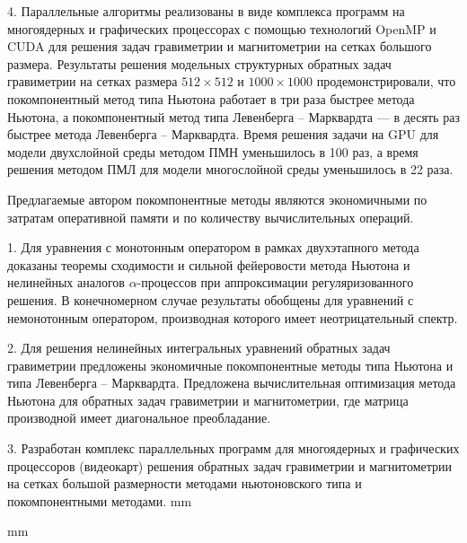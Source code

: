\documentclass[%
autoref,     %
href,        %
colorlinks,  %
]{disser}
\begin{document}
4. Параллельные алгоритмы реализованы в виде комплекса программ на многоядерных и графических процессорах с помощью технологий OpenMP и CUDA для решения задач гравиметрии и магнитометрии на сетках большого размера. 
Результаты решения модельных структурных обратных задач гравиметрии на сетках размера $512\times 512$ и $1000\times 1000$ продемонстрировали, что покомпонентный метод типа Ньютона работает в три раза быстрее метода Ньютона, а покомпонентный метод типа Левенберга -- Марквардта --- в десять раз быстрее метода Левенберга -- Марквардта. Время решения задачи на GPU для модели двухслойной среды методом ПМН уменьшилось в 100 раз, а время решения методом ПМЛ для модели многослойной среды уменьшилось в 22 раза. 

Предлагаемые автором покомпонентные методы являются экономичными по затратам оперативной памяти и по количеству вычислительных операций.

1. Для уравнения с монотонным оператором в рамках двухэтапного метода доказаны теоремы сходимости и сильной фейеровости метода Ньютона и нелинейных аналогов $\alpha$-процессов при аппроксимации регуляризованного решения. В конечномерном случае результаты обобщены для уравнений с немонотонным оператором, производная которого имеет неотрицательный спектр.

2. Для решения нелинейных интегральных уравнений обратных задач гравиметрии предложены экономичные покомпонентные методы типа Ньютона и типа Левенберга – Марквардта. Предложена вычислительная оптимизация метода Ньютона для обратных задач гравиметрии и магнитометрии, где матрица производной имеет диагональное преобладание. 

3. Разработан комплекс параллельных программ для многоядерных и графических процессоров (видеокарт) решения обратных задач гравиметрии и магнитометрии на сетках большой размерности методами ньютоновского типа и покомпонентными методами.
 mm 

\begingroup
\let\clearpage\relax
\printbibheading[title={Основные публикации по теме диссертации}]
 mm
\printbibliography[
heading=subbibliography,
keyword=hac,
title={Статьи в журналах из перечня ВАК}
]
\endgroup
\vspace {-10 mm}
\printbibliography[
heading=subbibliography,
keyword=scopus,
title={Публикации, проиндексированные в Scopus}
]
\vspace {-15 mm}
\printbibliography[
heading=subbibliography,
keyword=nohac,
title={Другие публикации}
]
\end{document}
